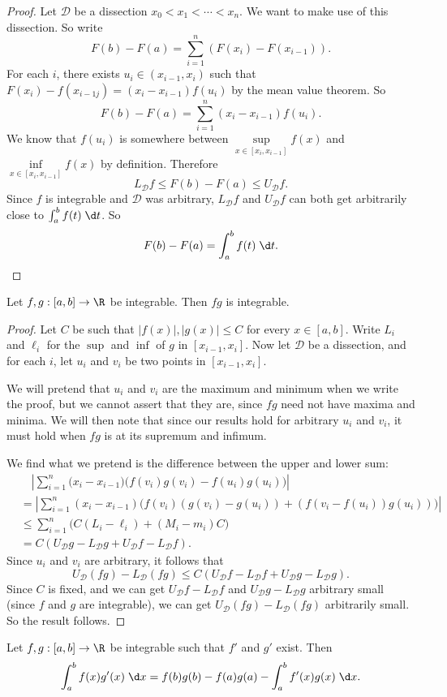 \documentclass[a4paper]{article}
\begin{document}
\begin{proof}
  Let $\mathcal{D}$ be a dissection $x_0 < x_1 < \cdots < x_n$. We want to make use of this dissection. So write
  \[
    F(b) - F(a) = \sum_{i = 1}^n (F(x_i) - F(x_{i - 1})).
  \]
  For each $i$, there exists $u_i\in (x_{i - 1}, x_i)$ such that $F(x_i) - f(x_{i - 1j}) = (x_i - x_{i - 1})f(u_i)$ by the mean value theorem. So
  \[
    F(b) - F(a) = \sum_{i = 1}^n (x_i - x_{i - 1})f(u_i).
  \]
  We know that $f(u_i)$ is somewhere between $\sup\limits_{x\in[x_i, x_{i - 1}]}f(x)$ and $\inf\limits_{x\in[x_i, x_{i - 1}]}f(x)$ by definition. Therefore
  \[
    L_\mathcal{D} f \leq F(b) - F(a) \leq U_\mathcal{D} f.
  \]
  Since $f$ is integrable and $\mathcal{D}$ was arbitrary, $L_\mathcal{D}f$ and $U_\mathcal{D}f$ can both get arbitrarily close to $\int_a^b f(t)\;\d t$. So
  \[
    F(b) - F(a) = \int_a^b f(t)\;\d t.
  \]
\end{proof}

\begin{prop}
  Let $f, g: [a, b] \to \R$ be integrable. Then $fg$ is integrable.
\end{prop}

\begin{proof}
  Let $C$ be such that $|f(x)|, |g(x)| \leq C$ for every $x\in [a, b]$. Write $L_i$ and $\ell_i$ for the $\sup$ and $\inf$ of $g$ in $[x_{i - 1}, x_i]$. Now let $\mathcal{D}$ be a dissection, and for each $i$, let $u_i$ and $v_i$ be two points in $[x_{i - 1}, x_i]$.

  We will pretend that $u_i$ and $v_i$ are the maximum and minimum when we write the proof, but we cannot assert that they are, since $fg$ need not have maxima and minima. We will then note that since our results hold for arbitrary $u_i$ and $v_i$, it must hold when $fg$ is at its supremum and infimum.

  We find what we pretend is the difference between the upper and lower sum:
  \begin{align*}
    &\quad \left|\sum_{i = 1}^n \big(x_i - x_{i - 1})(f(v_i)g(v_i) - f(u_i)g(u_i)\big)\right| \\
    &= \left|\sum_{i = 1}^{n}(x_i - x_{i - 1})\big(f(v_i)(g(v_i) - g(u_i)) + (f(v_i - f(u_i))g(u_i))\big)\right|\\
    &\leq \sum_{i = 1}^n \big(C(L_i - \ell_i) + (M_i - m_i)C\big)\\
    &=C(U_\mathcal{D}g - L_\mathcal{D}g + U_\mathcal{D}f - L_\mathcal{D}f).
  \end{align*}
  Since $u_i$ and $v_i$ are arbitrary, it follows that
  \[
    U_\mathcal{D}(fg) - L_\mathcal{D}(fg) \leq C(U_\mathcal{D}f - L_\mathcal{D}f + U_\mathcal{D}g - L_\mathcal{D}g).
  \]
  Since $C$ is fixed, and we can get $U_\mathcal{D} f - L_\mathcal{D}f$ and $U_\mathcal{D}g - L_\mathcal{D}g$ arbitrary small (since $f$ and $g$ are integrable), we can get $U_\mathcal{D}(fg) - L_\mathcal{D}(fg)$ arbitrarily small. So the result follows.
\end{proof}
\begin{thm}
  Let $f, g:[a, b]\to \R$ be integrable such that $f'$ and $g'$ exist. Then
  \[
    \int_a^b f(x)g'(x)\;\d x = f(b)g(b) - f(a)g(a) - \int_a^b f'(x)g(x)\;\d x.
  \]
\end{thm}
\end{document}
